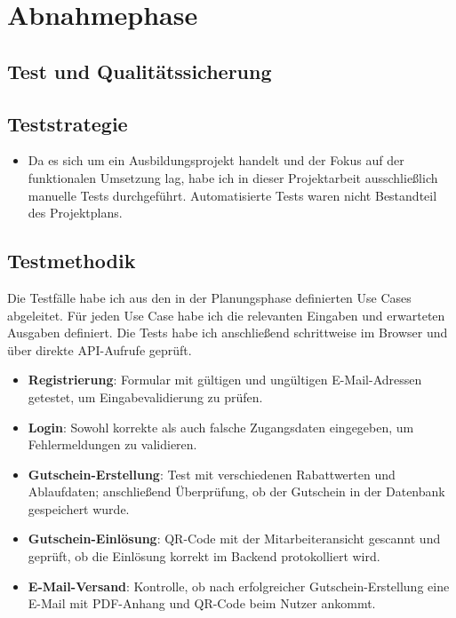 \section{Abnahmephase} 
\label{sec:Abnahmephase}

\subsection{Test und Qualitätssicherung}

\subsection{Teststrategie}
\begin{itemize}
  \item Da es sich um ein Ausbildungsprojekt handelt und der Fokus auf der              funktionalen Umsetzung lag,
habe ich in dieser Projektarbeit ausschließlich manuelle Tests durchgeführt.
Automatisierte Tests waren nicht Bestandteil des Projektplans.
\end{itemize}

\subsection{Testmethodik}
\label{sec:Testmethodik}
Die Testfälle habe ich aus den in der Planungsphase definierten Use Cases abgeleitet.
Für jeden Use Case habe ich die relevanten Eingaben und erwarteten Ausgaben definiert.
Die Tests habe ich anschließend schrittweise im Browser und über direkte API-Aufrufe geprüft.

\begin{itemize}
    \item \textbf{Registrierung}: Formular mit gültigen und ungültigen E-Mail-Adressen getestet, um Eingabevalidierung zu prüfen.
    \item \textbf{Login}: Sowohl korrekte als auch falsche Zugangsdaten eingegeben, um Fehlermeldungen zu validieren.
    \item \textbf{Gutschein-Erstellung}: Test mit verschiedenen Rabattwerten und Ablaufdaten; anschließend Überprüfung, ob der Gutschein in der Datenbank gespeichert wurde.
    \item \textbf{Gutschein-Einlösung}: QR-Code mit der Mitarbeiteransicht gescannt und geprüft, ob die Einlösung korrekt im Backend protokolliert wird.
    \item \textbf{E-Mail-Versand}: Kontrolle, ob nach erfolgreicher Gutschein-Erstellung eine E-Mail mit PDF-Anhang und QR-Code beim Nutzer ankommt.
\end{itemize}
\clearpage

